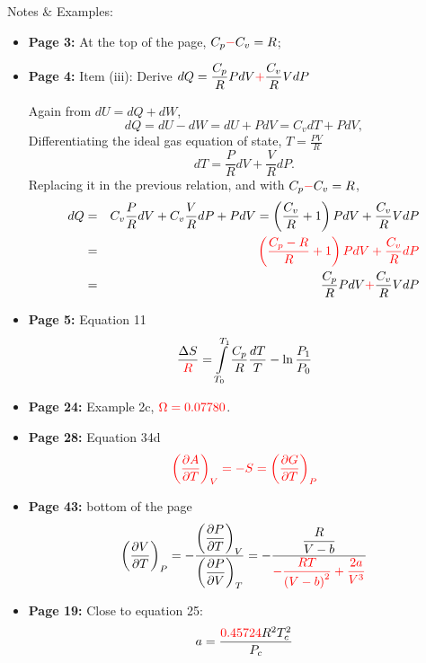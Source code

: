 \documentclass[12pts,a4paper,amsmath,amssymb,floatfix]{article}%
\newcommand{\frc}{\displaystyle\frac}
\newcommand{\red}{\textcolor{red}}
\newcommand{\Partial}[3][error]{\left(\frc{\partial #1}{\partial #2}\right)_{#3}}
\begin{document}
\noindent
{\Large Notes $\&$ Examples:}
\begin{itemize}
%
  \item {\bf Page 3:}  At the top of the page, $C_{p}\red{-}C_{v}=R$;
%
  \item {\bf Page 4:}  Item (iii): Derive $dQ=\frc{C_{p}}{R} PdV \red{+} \frc{C_{v}}{R} VdP$

           Again from $dU = dQ + dW$,
           \begin{displaymath}
               dQ = dU -dW = dU + PdV = C_{v}dT + PdV,
           \end{displaymath}
           Differentiating the ideal gas equation of state, $T=\frc{PV}{R}$
           \begin{displaymath}
                dT = \frc{P}{R}dV + \frc{V}{R}dP.
           \end{displaymath}
           Replacing it in the previous relation, and with $C_{p}\red{-}C_{v}=R$,
           \begin{eqnarray}
             dQ &=& C_{v}\frc{P}{R}dV + C_{v}\frc{V}{R}dP + PdV = \left(\frc{C_{v}}{R}+1\right)PdV + \frc{C_{v}}{R}VdP \nonumber \\
                &=& \red{\left(\frc{C_{p}-R}{R}+1\right)PdV + \frc{C_{v}}{R}dP} \nonumber \\
                &=&  \frc{C_{p}}{R} PdV \red{+} \frc{C_{v}}{R} VdP  \nonumber
           \end{eqnarray}
%
   \item {\bf Page 5:} Equation 11
     \begin{displaymath}
       \frc{\Delta S}{\red{R}} = \int\limits_{T_{0}}^{T_{1}} \frc{C_{p}}{R}\frc{dT}{T} - \ln{\frc{P_{1}}{P_{0}}}
     \end{displaymath}
%
   \item {\bf Page 24:} Example 2c, $\red{\Omega=0.07780}$.
%
   \item {\bf Page 28:} Equation 34d
     \begin{displaymath}
        \red{\left(\frc{\partial A}{\partial T}\right)_{V} = -S =  \left(\frc{\partial G}{\partial T}\right)_{P}}
     \end{displaymath}
%
   \item {\bf Page 43:} bottom of the page
     \begin{displaymath}
       \Partial[V]{T}{P} = -\frc{\Partial[P]{T}{V}}{\Partial[P]{V}{T}} = -\frc{\frc{R}{V-b}}{\red{-\frc{RT}{\left(V-b\right)^{2}}+\frc{2a}{V^{3}}}} 
     \end{displaymath}


   \item {\bf Page 19:} Close to equation 25: 
                          \begin{displaymath}
                              a = \frc{\red{0.45724} R^{2}T_{c}^{2}}{P_{c}}
                          \end{displaymath}      
           
%
\end{itemize}
\end{document}
